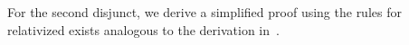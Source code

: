 \documentclass{article}
\newcommand{\proofrule}[3][]{#1 \frac{\raisebox{.7ex}{\normalsize{$#2$}}}
  {\raisebox{-1.0ex}{\normalsize{$#3$}}}}
\newcommand{\placeholder}[1][]{\pi_{#1}}
\newcommand{\loc}{l}
\newcommand{\region}{\mathit{cc}}
\newcommand{\suc}{\mathit{succ}}
\newcommand{\pre}{\mathit{pred}}
\newcommand{\inv}{\mathit{inv}}
\begin{document}
For the second disjunct, we derive a simplified proof using the rules for relativized exists analogous to the derivation in~\cite[Appendix C.1]{FC:14report}.

\end{document}
